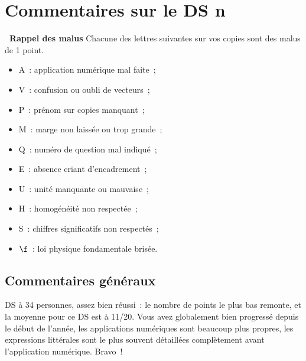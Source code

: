 \documentclass[a4paper, 10pt, final, garamond]{book}
\begin{document}
\setcounter{chapter}{4}

\chapter{Commentaires sur le DS n}

\begin{NCprop}[width=\linewidth]{\centering\bfseries\ Rappel des malus}
    Chacune des lettres suivantes sur vos copies sont des malus de \num{1}
    point.\smallbreak
    \begin{minipage}{0.50\linewidth}
        \begin{itemize}
            \item A~: application numérique mal faite~;
            \item V~: confusion ou oubli de vecteurs~;
            \item P~: prénom sur copies manquant~;
            \item M~: marge non laissée ou trop grande~;
            \item Q~: numéro de question mal indiqué~;
        \end{itemize}
    \end{minipage}
    \begin{minipage}{0.50\linewidth}
        \begin{itemize}
            \item E~: absence criant d'encadrement~;
            \item U~: unité manquante ou mauvaise~;
            \item H~: homogénéité non respectée~;
            \item S~: chiffres significatifs non respectés~;
            \item $\f$~: loi physique fondamentale brisée.
        \end{itemize}
    \end{minipage}
\end{NCprop}

\section{Commentaires généraux}

DS à 34 personnes, assez bien réussi~: le nombre de points le plus bas remonte,
et la moyenne pour ce DS est à 11/20. Vous avez globalement bien progressé
depuis le début de l'année, les applications numériques sont beaucoup plus
propres, les expressions littérales sont le plus souvent détaillées complètement
avant l'application numérique. Bravo~! \bigbreak
\end{document}
